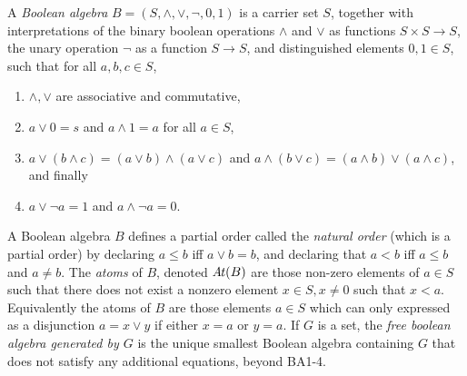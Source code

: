 \documentclass{article}
\theoremstyle{plain}
\theoremstyle{definition}
\theoremstyle{remark}
\newcommand\At[1]{\mathit{A\mkern-2mu t}(#1)}
\begin{document}
	\begin{defn}
		A \emph{Boolean algebra} $B = (S, \land,\lor,\lnot,0,1)$ is a carrier set $S$, together with interpretations of the binary boolean operations $\land $ and $\lor$ as functions $S\times S \to S$, the unary operation $\lnot$ as a function $S \to S$, and distinguished elements $0, 1 \in S$, such that for all $a, b, c \in S$, 
		\begin{enumerate}[itemsep=0pt, parsep=1pt,label={BA\arabic*.}]
			\item $\land, \lor$ are associative and commutative,
			\item $a \lor 0 = s$ and $a \land 1 = a$ for all $a \in S$,
			\item $a \lor(b \land c) = (a \lor b) \land (a \lor c)$ and $a \land(b \lor c) = (a \land b) \lor (a \land c)$,  and finally 
			\item $a \lor \lnot a = 1$ and $a \land \lnot a = 0$.
		\end{enumerate}
		A Boolean algebra $B$ defines a partial order called the \emph{natural order} (which is a partial order) by declaring $a \leq b$ iff $a \lor b = b$, and declaring that $a < b$ iff $a \leq b$ and $a \neq b$.
		The \emph{atoms} of $B$, denoted $\At B$ are those non-zero elements of $a \in S$ such that there does not exist a nonzero element $x \in S, x \ne 0$ such that $x < a$. Equivalently the atoms of $B$ are those elements $a\in S$ which can only expressed as a disjunction $a = x \lor y$ if either $x = a$ or $y=a$.
		If $G$ is a set, the \emph{free boolean algebra generated by $G$} is the unique smallest Boolean algebra containing $G$ that does not satisfy any additional equations, beyond {BA1-4}.
	\end{defn}
\end{document}
